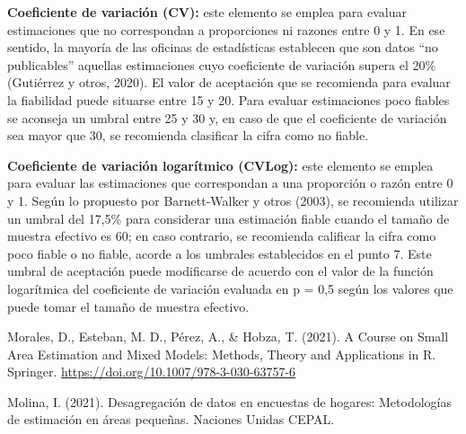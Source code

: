 \documentclass[12pt,spanish]{article}
\begin{document}
\textbf{Coeficiente de variación (CV):} este elemento se emplea para evaluar estimaciones que no correspondan a proporciones ni razones entre 0 y 1. En ese sentido, la mayoría de las oficinas de estadísticas establecen que son datos “no publicables” aquellas estimaciones cuyo coeficiente de variación supera el 20\% (Gutiérrez y otros, 2020). El valor de aceptación que se 
recomienda para evaluar la fiabilidad puede situarse entre 15 y 20. Para evaluar estimaciones poco fiables se aconseja un umbral entre 25 y 30 y, en caso de que el coeficiente de variación sea mayor que 30, se recomienda clasificar la cifra como no fiable. 

\textbf{Coeficiente de variación logarítmico (CVLog):} este elemento se emplea para evaluar las estimaciones que correspondan a una proporción o razón entre 0 y 1. Según lo propuesto por Barnett-Walker y otros (2003), se recomienda utilizar un umbral del 17,5\% para considerar una estimación fiable cuando el tamaño de muestra efectivo es 60; en caso contrario, se recomienda calificar la cifra como poco fiable o no fiable, acorde a los umbrales establecidos en el punto 
7. Este umbral de aceptación puede modificarse de acuerdo con el valor de la función logarítmica del coeficiente de variación evaluada en p = 0,5 según los valores que puede tomar el tamaño de muestra efectivo.





\begin{thebibliography}{3}

Morales, D., Esteban, M. D., Pérez, A., \& Hobza, T. (2021). A Course on Small Area Estimation and Mixed Models: Methods, Theory and Applications in R. Springer. \url{https://doi.org/10.1007/978-3-030-63757-6} 

Molina, I. (2021). Desagregación de datos en encuestas de hogares: Metodologías de estimación en áreas pequeñas. Naciones Unidas CEPAL.



\end{thebibliography}
\end{document}
